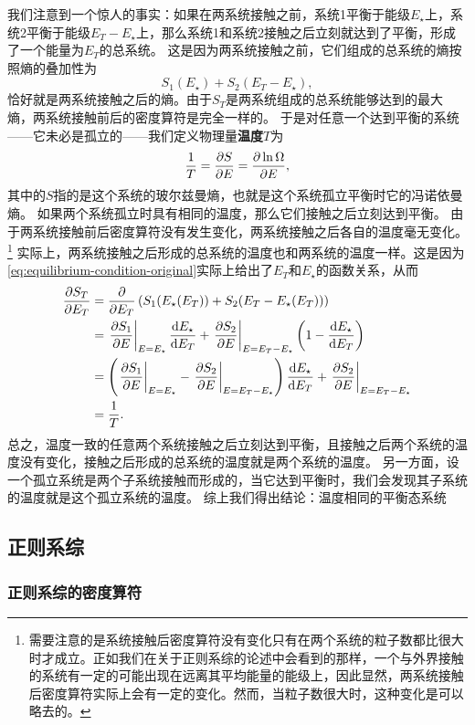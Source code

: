 \documentclass[hyperref, UTF8, a4paper]{ctexart}
\begin{document}
我们注意到一个惊人的事实：如果在两系统接触之前，系统1平衡于能级$E_\star$上，系统2平衡于能级$E_T-E_\star$上，那么系统1和系统2接触之后立刻就达到了平衡，形成了一个能量为$E_T$的总系统。
这是因为两系统接触之前，它们组成的总系统的熵按照熵的叠加性为
\[
    S_1(E_\star) + S_2(E_T-E_\star),
\]
恰好就是两系统接触之后的熵。由于$S_T$是两系统组成的总系统能够达到的最大熵，两系统接触前后的密度算符是完全一样的。
于是对任意一个达到平衡的系统——它未必是孤立的——我们定义物理量\textbf{温度}$T$为
\begin{equation}
    \frac{1}{T} = \pdv{S}{E} = \pdv{\ln \Omega}{E},
\end{equation}
其中的$S$指的是这个系统的玻尔兹曼熵，也就是这个系统孤立平衡时它的冯诺依曼熵。
如果两个系统孤立时具有相同的温度，那么它们接触之后立刻达到平衡。
由于两系统接触前后密度算符没有发生变化，两系统接触之后各自的温度毫无变化。%
\footnote{需要注意的是系统接触后密度算符没有变化只有在两个系统的粒子数都比很大时才成立。正如我们在关于正则系综的论述中会看到的那样，一个与外界接触的系统有一定的可能出现在远离其平均能量的能级上，因此显然，两系统接触后密度算符实际上会有一定的变化。然而，当粒子数很大时，这种变化是可以略去的。}
实际上，两系统接触之后形成的总系统的温度也和两系统的温度一样。这是因为\eqref{eq:equilibrium-condition-original}实际上给出了$E_T$和$E_\star$的函数关系，从而
\[
    \begin{aligned}
        \pdv{S_T}{E_T} &= \pdv{E_T} \left(S_1(E_\star(E_T)) + S_2(E_T-E_\star(E_T))\right) \\
        &= \eval{\pdv{S_1}{E}}_{E=E_\star} \dv{E_\star}{E_T} + \eval{\pdv{S_2}{E}}_{E=E_T-E_\star} \left( 1 - \dv{E_\star}{E_T} \right) \\
        &= \left( \eval{\pdv{S_1}{E}}_{E=E_\star} - \eval{\pdv{S_2}{E}}_{E=E_T-E_\star} \right) \dv{E_\star}{E_T} + \eval{\pdv{S_2}{E}}_{E=E_T-E_\star} \\
        &= \frac{1}{T}.
    \end{aligned}
\]
总之，温度一致的任意两个系统接触之后立刻达到平衡，且接触之后两个系统的温度没有变化，接触之后形成的总系统的温度就是两个系统的温度。
另一方面，设一个孤立系统是两个子系统接触而形成的，当它达到平衡时，我们会发现其子系统的温度就是这个孤立系统的温度。
综上我们得出结论：温度相同的平衡态系统

\subsection{正则系综}

\subsubsection{正则系综的密度算符}
\end{document}
